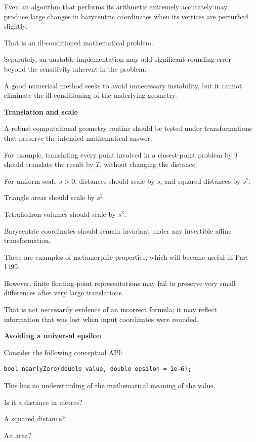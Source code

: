 Even an algorithm that performs its arithmetic extremely accurately may produce large changes in barycentric coordinates when its vertices are perturbed slightly.

That is an ill-conditioned mathematical problem.

Separately, an unstable implementation may add significant rounding error beyond the sensitivity inherent in the problem.

A good numerical method seeks to avoid unnecessary instability, but it cannot eliminate the ill-conditioning of the underlying geometry.

\textbf{Translation and scale}

A robust computational geometry routine should be tested under transformations that preserve the intended mathematical answer.

For example, translating every point involved in a closest-point problem by \(T\) should translate the result by \(T\), without changing the distance.

For uniform scale \(s>0\), distances should scale by \(s\), and squared distances by \(s^2\).

Triangle areas should scale by \(s^2\).

Tetrahedron volumes should scale by \(s^3\).

Barycentric coordinates should remain invariant under any invertible affine transformation.

These are examples of metamorphic properties, which will become useful in Part 1199.

However, finite floating-point representations may fail to preserve very small differences after very large translations.

That is not necessarily evidence of an incorrect formula; it may reflect information that was lost when input coordinates were rounded.

\textbf{Avoiding a universal epsilon}

Consider the following conceptual API:

\begin{verbatim}
bool nearlyZero(double value, double epsilon = 1e-6);
\end{verbatim}

This has no understanding of the mathematical meaning of the value.

Is it a distance in metres?

A squared distance?

An area?

